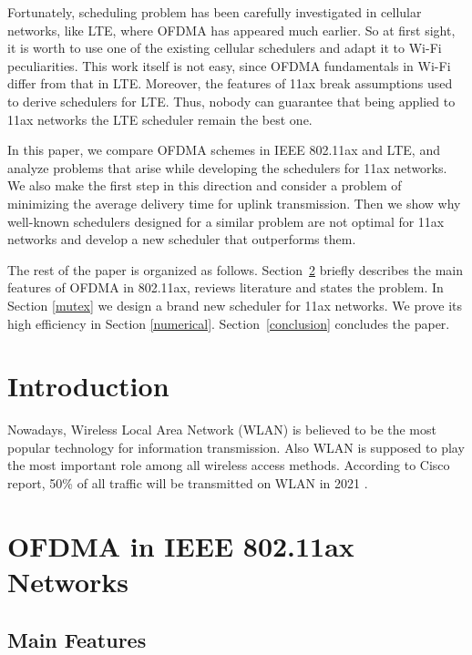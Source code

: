 Fortunately, scheduling problem has been carefully investigated in cellular networks, like LTE, where OFDMA has appeared much earlier. So at first sight, it is worth to use one of the existing cellular schedulers and adapt it to Wi-Fi peculiarities. This work itself is not easy, since OFDMA fundamentals in Wi-Fi differ from that in LTE. Moreover, the features of 11ax break assumptions used to derive schedulers for LTE. Thus, nobody can guarantee that being applied to 11ax networks the LTE scheduler remain the best one. 

In this paper, we compare OFDMA schemes in IEEE 802.11ax and LTE, and analyze problems that arise while developing the schedulers for 11ax networks. We also make the first step in this direction and consider a problem of minimizing the average delivery time for uplink transmission. Then we show why well-known schedulers designed for a similar problem are not optimal for 11ax networks and develop a new scheduler that outperforms them. 

The rest of the paper is organized as follows.
Section~\ref{sec:ofdma} briefly describes the main features of OFDMA in 802.11ax, reviews literature and states the problem.
In Section \ref{mutex} we design a brand new scheduler for 11ax networks.
We prove its high efficiency in Section \ref{numerical}.
Section~\ref{conclusion} concludes the paper. 

\section{Introduction}
Nowadays, Wireless Local Area Network (WLAN) is believed to be the most popular technology for information transmission. 
Also WLAN is supposed to play the most important role among all wireless access methods. 
According to Cisco report, 50\% of all traffic will be transmitted on WLAN in 2021 \cite{ciscoreport}. 
     

\section{OFDMA in IEEE 802.11ax Networks}
\label{sec:ofdma}
\subsection{Main Features}
\label{mainfeatures}




